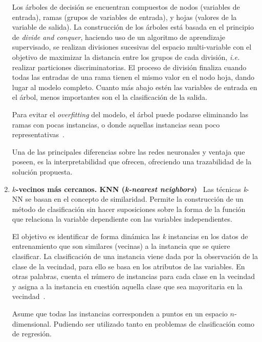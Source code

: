 \begin{enumerate}
	Los árboles de decisión se encuentran compuestos de nodos (variables de entrada), ramas (grupos de variables de entrada), y hojas (valores de la variable de salida). La construcción de los árboles está basada en el principio de \textit{divide and conquer}, haciendo uso de un algoritmo de aprendizaje supervisado, se realizan divisiones sucesivas del espacio multi-variable con el objetivo de maximizar la distancia entre los grupos de cada división, \textit{i.e.} realizar particiones discriminatorias. El proceso de división finaliza cuando todas las entradas de una rama tienen el mismo valor en el nodo hoja, dando lugar al modelo completo. Cuanto más abajo estén las variables de entrada en el árbol, menos importantes son el la clasificación  de la salida.
	
	Para evitar el \textit{overfitting} del modelo, el árbol puede podarse eliminando las ramas con pocas instancias, o donde aquellas instancias sean poco representativas~\cite{palmer2011data}.
	
	Una de las principales diferencias sobre las redes neuronales y ventaja que poseen, es la interpretabilidad que ofrecen, ofreciendo una trazabilidad de la solución propuesta.
	
	\item \textbf{$k$-vecinos más cercanos. KNN (\textit{k-nearest neighbors})}~\cite{guo2003knn,hand2007principles,palmer2011data} Las técnicas \textit{k}-NN se basan en el concepto de similaridad. Permite la construcción de un método de clasificación sin hacer suposiciones sobre la forma de la función que relaciona la variable dependiente con las variables independientes.
	
	El objetivo es identificar de forma dinámica las \textit{k} instancias en los datos de entrenamiento que son similares (vecinas) a la instancia que se quiere clasificar. La clasificación de una instancia viene dada por la observación de la clase de la vecindad, para ello se basa en los atributos de las variables. En otras palabras, cuenta el número de instancias para cada clase en la vecindad y asigna a la instancia en cuestión aquella clase que sea mayoritaria en la vecindad~\cite{potomac1999introduction}.
	
	Asume que todas las instancias corresponden a puntos en un espacio $n$-dimensional. Pudiendo ser utilizado tanto en problemas de clasificación como de regresión.
\end{enumerate}

